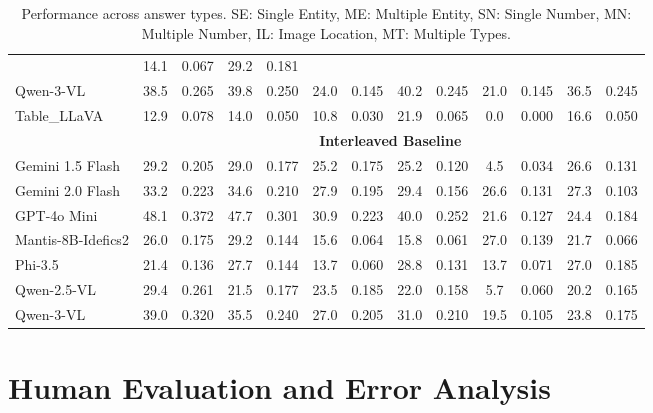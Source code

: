 \documentclass[11pt]{article}
\begin{document}
\begin{table}[h]
\begin{tabular}{lcc|cc|cc|cc|cc|cc}
 & 14.1   & 0.067 
 & 29.2   & 0.181 \\
Qwen-3-VL 
 & 38.5   & 0.265 
 & 39.8   & 0.250 
 & 24.0   & 0.145 
 & 40.2   & 0.245 
 & 21.0   & 0.145 
 & 36.5   & 0.245 \\
Table\_LLaVA 
 & 12.9   & 0.078 
 & 14.0   & 0.050 
 & 10.8   & 0.030 
 & 21.9   & 0.065 
 & 0.0    & 0.000 
 & 16.6   & 0.050 \\
\cmidrule{2-13}
& \multicolumn{12}{c}{\textbf{Interleaved Baseline}} \\
\cmidrule{2-13}
Gemini 1.5 Flash 
 & 29.2   & 0.205 
 & 29.0   & 0.177 
 & 25.2   & 0.175 
 & 25.2   & 0.120 
 & 4.5    & 0.034 
 & 26.6   & 0.131 \\
Gemini 2.0 Flash 
 & 33.2   & 0.223 
 & 34.6   & 0.210 
 & 27.9   & 0.195 
 & 29.4   & 0.156 
 & 26.6   & 0.131 
 & \cellcolor{yellow}27.3 & 0.103 \\
GPT-4o Mini 
 & \cellcolor{yellow}48.1 & \cellcolor{yellow}0.372 
 & \cellcolor{yellow}47.7 & \cellcolor{yellow}0.301 
 & \cellcolor{yellow}30.9 & \cellcolor{yellow}0.223 
 & \cellcolor{yellow}40.0 & \cellcolor{yellow}0.252 
 & 21.6   & 0.127 
 & 24.4   & 0.184 \\
Mantis-8B-Idefics2 
 & 26.0   & 0.175 
 & 29.2   & 0.144 
 & 15.6   & 0.064 
 & 15.8   & 0.061 
 & \cellcolor{yellow}27.0 & \cellcolor{yellow}0.139 
 & 21.7   & 0.066 \\
Phi-3.5 
 & 21.4   & 0.136 
 & 27.7   & 0.144 
 & 13.7   & 0.060 
 & 28.8   & 0.131 
 & 13.7   & 0.071 
 & 27.0 & \cellcolor{yellow}0.185 \\
Qwen-2.5-VL 
 & 29.4   & 0.261 
 & 21.5   & 0.177 
 & 23.5   & 0.185 
 & 22.0   & 0.158 
 & 5.7    & 0.060 
 & 20.2   & 0.165 \\
Qwen-3-VL 
 & 39.0   & 0.320 
 & 35.5   & 0.240 
 & 27.0   & 0.205 
 & 31.0   & 0.210 
 & 19.5   & 0.105 
 & 23.8   & 0.175 \\
\bottomrule
\end{tabular}
\vspace{-0.5em}
\caption{Performance across answer types. SE: Single Entity, ME: Multiple Entity, SN: Single Number, MN: Multiple Number, IL: Image Location, MT: Multiple Types.}
\label{tab:answer_types_results}
\vspace{-0.5em}
\end{table}

\section{Human Evaluation and Error Analysis}\label{sec:HEEA}
\end{document}
